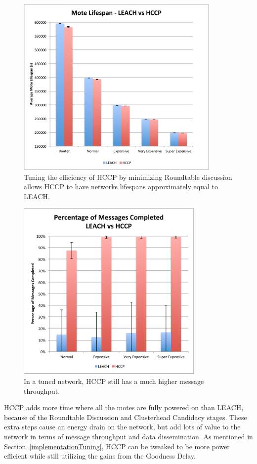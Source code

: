 \begin{figure}[htbp]
    \centering
        \includegraphics[height=3.5in]{images/lifespan/life.pdf}
    \caption{Tuning the efficiency of HCCP by minimizing Roundtable discussion allows HCCP to have networks lifespans approximately equal to LEACH.}
    \label{fig:images_lifespan_life}
\end{figure}

\begin{figure}[htbp]
    \centering
        \includegraphics[height=3.5in]{images/lifespan/messages.pdf}
    \caption{In a tuned network, HCCP still has a much higher message throughput.}
    \label{fig:images_lifespan_messages}
\end{figure}

HCCP adds more time where all the motes are fully powered on than LEACH, because of the Roundtable Discussion 
and Clusterhead Candidacy stages. These extra steps cause an energy drain on the network,
but add lots of value to the network in terms of message throughput and data dissemination. 
As mentioned in Section~\ref{implementationTuning}, HCCP can be tweaked to be more power efficient while
still utilizing the gains from the Goodness Delay.

